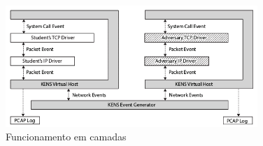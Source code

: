\begin{figure}[H]
	\centering
    \includegraphics[width=0.85\textwidth]{04-figuras/KENVSv2.png}
    \caption{Funcionamento em camadas}
    \label{fig:KENVSv2}
\end{figure}  	 
	 